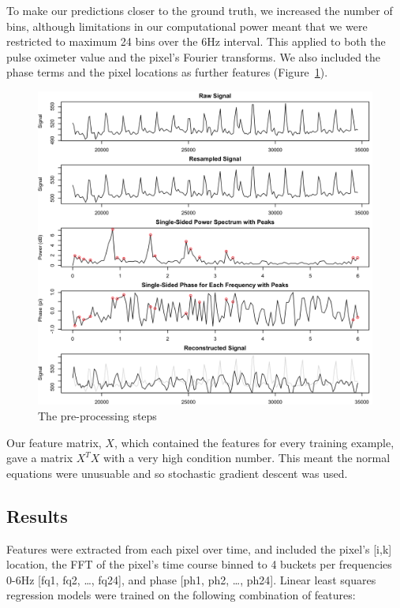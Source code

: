 \documentclass[12pt]{article}
\begin{document}
  To make our predictions closer to the ground truth, we increased the number of bins, although limitations in our computational power meant that we were restricted to maximum 24 bins over the 6Hz interval. This applied to both the pulse oximeter value and the pixel's Fourier transforms. We also included the phase terms and the pixel locations as further features (Figure~\ref{figure:preprocessing}).

  \begin{figure}[tb]
    \captionsetup{justification=centering}
    \includegraphics[width=\textwidth]{images/fig1.png}
    \caption{The pre-processing steps \label{figure:preprocessing}}
  \end{figure}
  
 Our feature matrix, \(X\), which contained the features for every training example, gave a matrix $X^TX$ with a very high condition number. This meant the normal equations were unusuable and so stochastic gradient descent was used.
 
 \subsection*{Results}
 Features were extracted from each pixel over time, and included the pixel’s [i,k] location, the FFT of the pixel’s time course binned to 4 buckets per frequencies 0-6Hz [fq1, fq2, …, fq24], and phase [ph1, ph2, …, ph24]. Linear least squares regression models were trained on the following combination of features:\\
\end{document}

